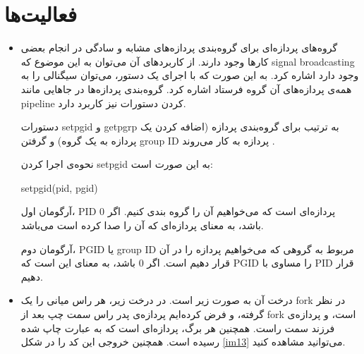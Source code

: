 \documentclass[12pt]{article}
\begin{document}
        \section{فعالیت‌ها}

        \begin{itemize}
        \item 
        گروه‌های پردازه‌ای برای گروه‌بندی پردازه‌های مشابه و سادگی در انجام بعضی کارها وجود دارند. از کاربردهای آن می‌توان به این موضوع که 
        \textenglish{signal broadcasting}
        وجود دارد اشاره کرد. به این صورت که با اجرای یک دستور، می‌توان سیگنالی را به همه‌ی پردازه‌های آن گروه فرستاد اشاره کرد\cite{man7-credentials}. گروه‌بندی پردازه‌ها در جاهایی مانند 
        \textenglish{pipeline}
        کردن دستورات نیز کاربرد دارد. 

        دستورات
        \textenglish{setpgid}
        و 
        \textenglish{getpgrp}
        به ترتیب برای گروه‌بندی پردازه (اضافه کردن یک پردازه به یک گروه) و گرفتن 
        \textenglish{group ID}
        پردازه به کار می‌روند
        \cite{man7-setpgid}.

        نحوه‌ی اجرا کردن
        \textenglish{setpgid}
        به این صورت است:

        \begin{english}
            setpgid(pid, pgid)
        \end{english}

        آرگومان اول، 
        \textenglish{PID}
        پردازه‌ای است که می‌خواهیم آن را گروه بندی کنیم. اگر
        \textenglish{0}
        باشد، به معنای پردازه‌ای که آن را صدا کرده است می‌باشد.

        آرگومان دوم،
        \textenglish{PGID}
        یا
        \textenglish{group ID}
        مربوط به گروهی که می‌خواهیم پردازه را در آن قرار دهیم است. اگر 
        \textenglish{0}
        باشد، به معنای این است که
        \textenglish{PGID}
        را مساوی با 
        \textenglish{PID}
        قرار دهیم.


        \item 
        درخت آن به صورت زیر است. در درخت زیر، هر راس میانی را یک
        \textenglish{fork}
        در نظر گرفته، و فرض کرده‌ایم پردازه‌ی پدر راس سمت چپ بعد از
        \textenglish{fork}
        است، و پردازه‌ی فرزند سمت راست. همچنین هر برگ، پردازه‌ای است که به عبارت چاپ شده رسیده است. همچنین خروجی این کد را در شکل
        \ref{im13}
        می‌توانید مشاهده کنید.


\end{itemize}
\end{document}
